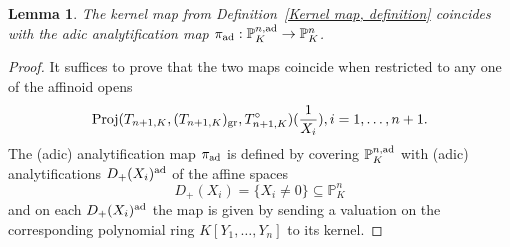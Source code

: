 \documentclass[12pt,twoside,a4paper]{article}
\newtheorem{lemma}[thm]{Lemma}
\theoremstyle{definition}
\theoremstyle{remark}
\newcommand\ad{{\rm ad}}
\newcommand\gr{{\rm gr}}
\newcommand\Proj{{\rm Proj}}
\begin{document}
\begin{lemma}\label{Analytification}The kernel map from Definition~\ref{Kernel map, definition} coincides with the adic analytification map $\pi_{\ad}: \mathbb{P}_{K}^{n,\ad}\to \mathbb{P}_{K}^{n}$.\end{lemma}
\begin{proof}It suffices to prove that the two maps coincide when restricted to any one of the affinoid opens \begin{equation*}\Proj(T_{n+1, K}, (T_{n+1, K})_{\gr}, T_{n+1, K}^{\circ})(\frac{1}{X_{i}}), i=1,\dots, n+1.\end{equation*}The (adic) analytification map $\pi_{\ad}$ is defined by covering $\mathbb{P}_{K}^{n,\ad}$ with (adic) analytifications $D_{+}(X_{i})^{\ad}$ of the affine spaces \begin{equation*}D_{+}(X_{i})=\{X_{i}\neq 0\}\subseteq \mathbb{P}_{K}^{n}\end{equation*}and on each $D_{+}(X_{i})^{\ad}$ the map is given by sending a valuation on the corresponding polynomial ring $K[Y_1,\dots, Y_n]$ to its kernel.


\end{proof}
\end{document}

